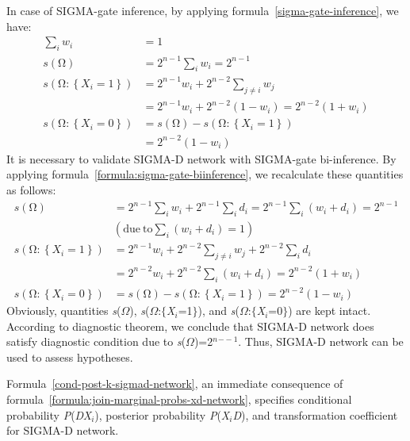 \documentclass{article}
\numberwithin{equation}{section}
\numberwithin{figure}{section}
\numberwithin{table}{section}
\begin{document}
In case of SIGMA-gate inference, by applying formula~\ref{sigma-gate-inference}, we have:
\begin{align*}
\sum_i{w_i}&=1\\
s\left(\mathrm{\Omega }\right)&=2^{n-1}\sum_i{w_i}=2^{n-1}\\
s\left(\mathrm{\Omega }\mathrm{:}\left\{X_i=1\right\}\right)&=2^{n-1}w_i+2^{n-2}\sum_{j\neq i}{w_j}\\
&=2^{n-1}w_i+2^{n-2}\left(1-w_i\right)=2^{n-2}\left(1+w_i\right)\\
s\left(\mathrm{\Omega }\mathrm{:}\left\{X_i=0\right\}\right)&=s\left(\mathrm{\Omega }\right)-s\left(\mathrm{\Omega }\mathrm{:}\left\{X_i=1\right\}\right)\\
&=2^{n-2}\left(1-w_i\right)
\end{align*}
It is necessary to validate SIGMA-D network with SIGMA-gate bi-inference. By applying formula~\ref{formula:sigma-gate-biinference}, we recalculate these quantities as follows:
\begin{align*}
s\left(\mathrm{\Omega }\right)&=2^{n-1}\sum_i{w_i}+2^{n-1}\sum_i{d_i}=2^{n-1}\sum_i{\left(w_i+d_i\right)}=2^{n-1}\\
&\left(\mathrm{due\ to}\sum_i{\left(w_i+d_i\right)}=1\right)\\
s\left(\mathrm{\Omega }\mathrm{:}\left\{X_i=1\right\}\right)&=2^{n-1}w_i+2^{n-2}\sum_{j\neq i}{w_j}+2^{n-2}\sum_i{d_i}\\
&=2^{n-2}w_i+2^{n-2}\sum_i{\left(w_i+d_i\right)}=2^{n-2}\left(1+w_i\right)\\
s\left(\mathrm{\Omega }\mathrm{:}\left\{X_i=0\right\}\right)&=s\left(\mathrm{\Omega }\right)-s\left(\mathrm{\Omega }\mathrm{:}\left\{X_i=1\right\}\right)=2^{n-2}\left(1-w_i\right)
\end{align*}
Obviously, quantities \textit{s}($\Omega$), \textit{s}($\Omega$:$\{$\textit{X${}_{i}$}=1$\}$), and \textit{s}($\Omega$:$\{$\textit{X${}_{i}$}=0$\}$) are kept intact. According to diagnostic theorem, we conclude that SIGMA-D network does satisfy diagnostic condition due to \textit{s}($\Omega$)=2\textit{${}^{n}$}${}^{--1}$. Thus, SIGMA-D network can be used to assess hypotheses.

Formula~\ref{cond-post-k-sigmad-network}, an immediate consequence of formula~\ref{formula:join-marginal-probs-xd-network}, specifies conditional probability \textit{P}(\textit{D{\textbar}X${}_{i}$}), posterior probability \textit{P}(\textit{X${}_{i}${\textbar}D}), and transformation coefficient for SIGMA-D network.
\end{document}

